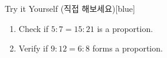 \documentclass[12pt]{book}
\begin{document}
\begin{flexbox}{Try it Yourself (직접 해보세요)}[blue]
\begin{enumerate}
  \item Check if $5:7 = 15:21$ is a proportion. \vspace*{20pt}
  \item Verify if $9:12 = 6:8$ forms a proportion. \vspace*{20pt}
\end{enumerate}
\end{flexbox}

  
  
  
  
  
  
  
  
  
  
  
  
  
  
\end{document}
